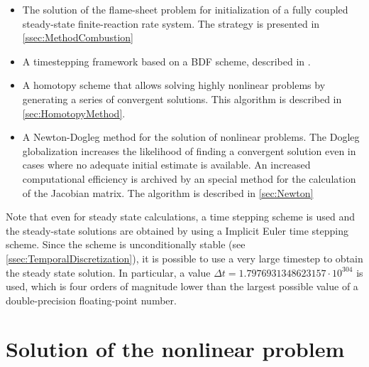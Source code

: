 \begin{itemize}
\item  The solution of the flame-sheet problem for initialization of a fully coupled steady-state finite-reaction rate system. The strategy is presented in \cref{ssec:MethodCombustion}
\item A timestepping framework based on a \gls{BDF} scheme, described in \textcite{kummer2018}.
\item A homotopy scheme that allows solving highly nonlinear problems by generating a series of convergent solutions. This algorithm is described in \cref{sec:HomotopyMethod}.
\item A Newton-Dogleg method for the solution of nonlinear problems. The Dogleg globalization increases the likelihood of finding a convergent solution even in cases where no adequate initial estimate is available. An increased computational efficiency is archived by an special method for the calculation of the Jacobian matrix. The algorithm is described in \cref{sec:Newton}
\end{itemize}

Note that even for steady state calculations, a time stepping scheme is used and the steady-state solutions are obtained by using a Implicit Euler time stepping scheme. Since the scheme is unconditionally stable (see \cref{ssec:TemporalDiscretization}), it is possible to use a very large timestep to obtain the steady state solution. In particular, a value $\Delta t = 1.7976931348623157\cdot 10^{304}$ is used, which is four orders of magnitude lower than the largest possible value of a double-precision floating-point number.
\section{Solution of the nonlinear problem}\label{sec:SolNonLinProblem}



